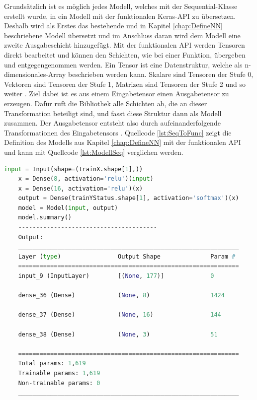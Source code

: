 Grundsätzlich ist es möglich jedes Modell, welches mit der \glqq Sequential\grqq{}-Klasse erstellt wurde, in ein Modell mit der funktionalen Keras-\ac{API} zu übersetzen. 
Deshalb wird als Erstes das bestehende und in Kapitel \ref*{chap:DefineNN} beschriebene Modell übersetzt und im Anschluss daran wird dem Modell eine zweite Ausgabeschicht
hinzugefügt.
Mit der funktionalen \ac{API} werden Tensoren direkt bearbeitet und können den Schichten, wie bei einer Funktion, übergeben und entgegengenommen werden. Ein Tensor ist eine
Datenstruktur, welche als n-dimensionales-Array beschrieben werden kann. Skalare sind Tensoren der Stufe 0, Vektoren sind Tensoren der Stufe 1, Matrizen sind Tensoren
der Stufe 2 und so weiter \cite[vgl. S.128]{AI_Huawei}. Ziel dabei ist es 
aus einem Eingabetensor einen Ausgabetensor zu erzeugen. Dafür ruft die Bibliothek alle Schichten ab, die an dieser Transformation beteiligt sind, und fasst diese Struktur
dann als Modell zusammen. Der Ausgabetensor entsteht also durch aufeinanderfolgende Transformationen des Eingabetensors \cite[vgl. S.305]{DL_PY}. 
Quellcode \ref*{lst:SeqToFunc} zeigt die Definition des Modells aus Kapitel \ref*{chap:DefineNN} mit der funktionalen \ac{API} und kann mit Quellcode \ref*{lst:ModellSeq}
verglichen werden. 

\begin{lstlisting}[language = python, caption={Modell mit funktionaler \acs{API} darstellen},captionpos=b, label = lst:SeqToFunc, floatplacement=H]
    input = Input(shape=(trainX.shape[1],))
    x = Dense(8, activation='relu')(input)
    x = Dense(16, activation='relu')(x)
    output = Dense(trainYStatus.shape[1], activation='softmax')(x)
    model = Model(input, output)
    model.summary()
    ---------------------------------------
    Output:
    ______________________________________________________________
    Layer (type)                Output Shape              Param #   
    ==============================================================
    input_9 (InputLayer)        [(None, 177)]             0         
                                                                    
    dense_36 (Dense)            (None, 8)                 1424      
                                                                    
    dense_37 (Dense)            (None, 16)                144       
                                                                    
    dense_38 (Dense)            (None, 3)                 51        
                                                                    
    ==============================================================
    Total params: 1,619
    Trainable params: 1,619
    Non-trainable params: 0
    ______________________________________________________________

\end{lstlisting}

